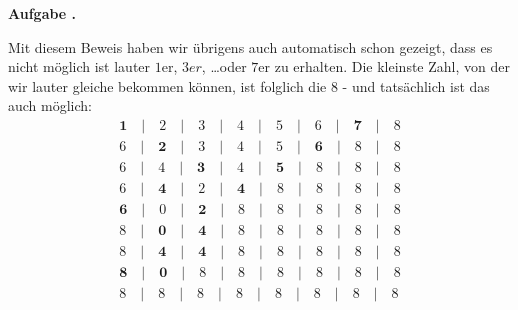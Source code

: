 \documentclass[a4paper,ngerman,12pt]{scrartcl}
\theoremstyle{definition}
\theoremstyle{plain}
\theoremstyle{remark}
\newlength{\aufgabenskip}
\newcounter{aufgabennummer}
\newenvironment{aufgabe}[1]{
	\addtocounter{aufgabennummer}{1}
	\textbf{Aufgabe \theaufgabennummer.} \emph{#1} \par
}{\vspace{\aufgabenskip}}
\begin{document}
\begin{aufgabe}{}
Mit diesem Beweis haben wir übrigens auch automatisch schon gezeigt, dass es nicht möglich ist lauter $1$er, $3er$, \dots oder $7$er zu erhalten. Die kleinste Zahl, von der wir lauter gleiche bekommen können, ist folglich die $8$ - und tatsächlich ist das auch möglich:
\begin{align*}
\mathbf{1} \quad\vert\quad 2 \quad\vert\quad 3 \quad\vert\quad 4 \quad\vert\quad 5 \quad\vert\quad 6 \quad\vert\quad \mathbf{7} \quad\vert\quad 8 \\
6 \quad\vert\quad \mathbf{2} \quad\vert\quad 3 \quad\vert\quad 4 \quad\vert\quad 5 \quad\vert\quad \mathbf{6} \quad\vert\quad 8 \quad\vert\quad 8 \\
6 \quad\vert\quad 4 \quad\vert\quad \mathbf{3} \quad\vert\quad 4 \quad\vert\quad \mathbf{5} \quad\vert\quad 8 \quad\vert\quad 8 \quad\vert\quad 8 \\
6 \quad\vert\quad \mathbf{4} \quad\vert\quad 2 \quad\vert\quad \mathbf{4} \quad\vert\quad 8 \quad\vert\quad 8 \quad\vert\quad 8 \quad\vert\quad 8 \\
\mathbf{6} \quad\vert\quad 0 \quad\vert\quad \mathbf{2} \quad\vert\quad 8 \quad\vert\quad 8 \quad\vert\quad 8 \quad\vert\quad 8 \quad\vert\quad 8 \\
8 \quad\vert\quad \mathbf{0} \quad\vert\quad \mathbf{4} \quad\vert\quad 8 \quad\vert\quad 8 \quad\vert\quad 8 \quad\vert\quad 8 \quad\vert\quad 8 \\
8 \quad\vert\quad \mathbf{4} \quad\vert\quad \mathbf{4} \quad\vert\quad 8 \quad\vert\quad 8 \quad\vert\quad 8 \quad\vert\quad 8 \quad\vert\quad 8 \\
\mathbf{8} \quad\vert\quad \mathbf{0} \quad\vert\quad 8 \quad\vert\quad 8 \quad\vert\quad 8 \quad\vert\quad 8 \quad\vert\quad 8 \quad\vert\quad 8 \\
8 \quad\vert\quad 8 \quad\vert\quad 8 \quad\vert\quad 8 \quad\vert\quad 8 \quad\vert\quad 8 \quad\vert\quad 8 \quad\vert\quad 8
\end{align*}
\end{aufgabe}
\end{document}
